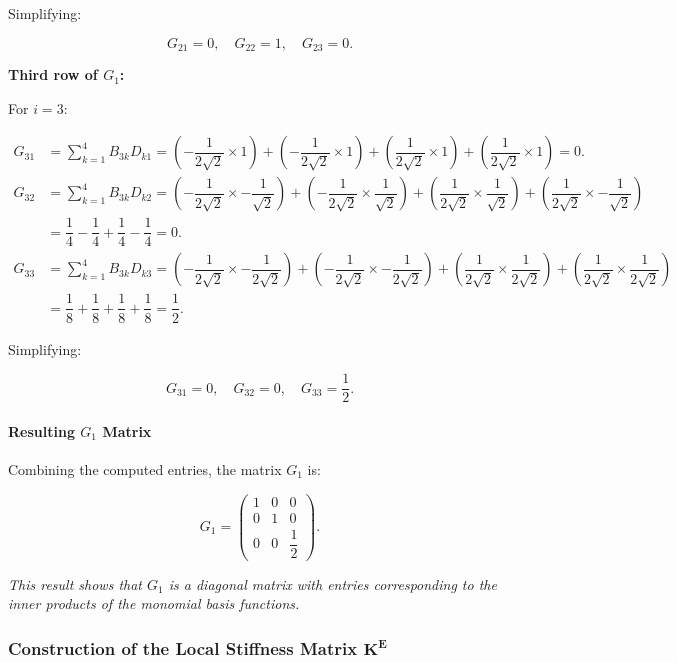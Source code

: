 \documentclass[class=article, crop=false]{standalone}
\begin{document}
Simplifying:

\[
G_{21} = 0, \quad G_{22} = 1, \quad G_{23} = 0.
\]

\textbf{Third row of $G_1$:}

For $i = 3$:

\[
\begin{aligned}
G_{31} &= \sum_{k=1}^{4} B_{3k} D_{k1} = \left( -\dfrac{1}{2\sqrt{2}} \times 1 \right) + \left( -\dfrac{1}{2\sqrt{2}} \times 1 \right) + \left( \dfrac{1}{2\sqrt{2}} \times 1 \right) + \left( \dfrac{1}{2\sqrt{2}} \times 1 \right) = 0. \\
G_{32} &= \sum_{k=1}^{4} B_{3k} D_{k2} = \left( -\dfrac{1}{2\sqrt{2}} \times -\dfrac{1}{\sqrt{2}} \right) + \left( -\dfrac{1}{2\sqrt{2}} \times \dfrac{1}{\sqrt{2}} \right) + \left( \dfrac{1}{2\sqrt{2}} \times \dfrac{1}{\sqrt{2}} \right) + \left( \dfrac{1}{2\sqrt{2}} \times -\dfrac{1}{\sqrt{2}} \right) \\
&= \dfrac{1}{4} - \dfrac{1}{4} + \dfrac{1}{4} - \dfrac{1}{4} = 0. \\
G_{33} &= \sum_{k=1}^{4} B_{3k} D_{k3} = \left( -\dfrac{1}{2\sqrt{2}} \times -\dfrac{1}{2\sqrt{2}} \right) + \left( -\dfrac{1}{2\sqrt{2}} \times -\dfrac{1}{2\sqrt{2}} \right) + \left( \dfrac{1}{2\sqrt{2}} \times \dfrac{1}{2\sqrt{2}} \right) + \left( \dfrac{1}{2\sqrt{2}} \times \dfrac{1}{2\sqrt{2}} \right) \\
&= \dfrac{1}{8} + \dfrac{1}{8} + \dfrac{1}{8} + \dfrac{1}{8} = \dfrac{1}{2}.
\end{aligned}
\]

Simplifying:

\[
G_{31} = 0, \quad G_{32} = 0, \quad G_{33} = \dfrac{1}{2}.
\]

\paragraph{Resulting $G_1$ Matrix}

Combining the computed entries, the matrix $G_1$ is:

\[
G_1 = \begin{pmatrix}
1 & 0 & 0 \\
0 & 1 & 0 \\
0 & 0 & \dfrac{1}{2}
\end{pmatrix}.
\]

\noindent
\textit{This result shows that $G_1$ is a diagonal matrix with entries corresponding to the inner products of the monomial basis functions.}

\subsubsection{Construction of the Local Stiffness Matrix $\boldsymbol{K^E}$}
\end{document}
